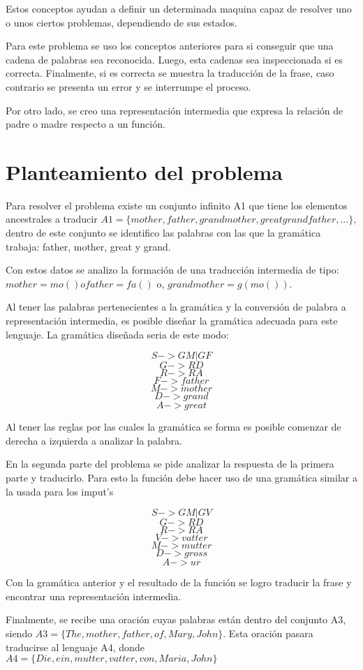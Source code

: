 \documentclass[conference]{IEEEtran}
\begin{document}
Estos conceptos ayudan a definir un determinada maquina capaz de resolver uno o unos ciertos problemas, dependiendo de sus estados.

Para este problema se uso los conceptos anteriores para si conseguir que una cadena de palabras sea reconocida. Luego, esta cadenas sea inspeccionada si es correcta. Finalmente, si es correcta se muestra la traducci\'on de la frase, caso contrario se presenta un error y se interrumpe el proceso.

Por otro lado, se creo una representaci\'on intermedia que expresa la relaci\'on de padre o madre respecto a un funci\'on.

\section{Planteamiento del problema}

Para resolver el problema existe un conjunto infinito A1 que tiene los elementos ancestrales a traducir $A1 = \{mother, father, grandmother, greatgrandfather, ...\}$, 
dentro de este conjunto se identifico las palabras con las que la gram\'atica trabaja: father, mother, great y grand.

Con estos datos se analizo la formaci\'on de una traducci\'on intermedia de tipo:
$mother = mo() o father = fa()$ o,
$grandmother = g(mo())$. 

Al tener las palabras pertenecientes a la gram\'atica y la conversi\'on de palabra a representaci\'on intermedia, es posible diseñar la gram\'atica adecuada para este lenguaje. La gram\'atica diseñada seria de este modo:

$$S-> G M | G F  $$
$$G-> R D $$
$$R-> R A $$
$$F-> father$$
$$M-> mother$$
$$D-> grand$$
$$A-> great$$

Al tener las reglas por las cuales la gram\'atica se forma es posible comenzar de derecha a izquierda a analizar la palabra.

En la segunda parte del problema se pide analizar la respuesta de la primera parte y traducirlo. Para esto la funci\'on debe hacer uso de una gram\'atica similar a la usada para los imput's

$$S-> G M | G V  $$
$$G-> R D $$
$$R-> R A $$
$$V-> vatter$$
$$M-> mutter$$
$$D-> gross$$
$$A-> ur$$

Con la gram\'atica anterior y el resultado de la funci\'on se logro traducir la frase y encontrar una representaci\'on intermedia.

Finalmente, se recibe una oraci\'on cuyas palabras est\'an dentro del conjunto A3, siendo $A3 = \{The, mother, father, of, Mary, John \}$. Esta oraci\'on pasara traducirse al lenguaje A4, donde $A4 = \{Die, ein, mutter, vatter, von, Maria, John \}$
\end{document}
